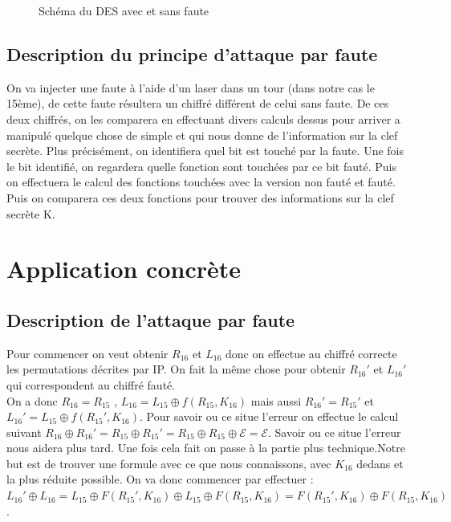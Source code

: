 \documentclass[a4paper]{report}
\begin{document}
\begin{figure}[h]
			
			\caption{Schéma du DES avec et sans faute}
			\end{figure}
		
			\section{Description du principe d'attaque par faute}
			
   On va injecter une faute à l'aide d'un laser dans un tour (dans notre cas le 15ème), de cette faute résultera un chiffré différent de celui sans faute.
De ces deux chiffrés, on les comparera en effectuant divers calculs dessus pour arriver a manipulé quelque chose de simple et qui nous donne de l'information sur la clef secrète.
Plus précisément, on identifiera quel bit est touché par la faute. Une fois le bit identifié, on regardera quelle fonction sont touchées par ce bit fauté.
Puis on effectuera le calcul des fonctions touchées avec la version non fauté et fauté. Puis on comparera ces deux fonctions pour trouver des informations sur la clef secrète K.
		\chapter{Application concrète}
			\section{Description de l'attaque par faute}
			Pour commencer on veut obtenir $R_{16}$ et $L_{16}$ donc on effectue au chiffré correcte les permutations décrites par IP. On fait la même chose pour obtenir $R_{16}'$ et $L_{16}'$ qui correspondent au chiffré fauté.\\
			On a donc $R_{16} = R_{15}$ , $L_{16} = L_{15}\oplus f(R_{15},K_{16})$ mais aussi $R_{16}'=R_{15}'$ et $L_{16}'=L_{15}\oplus f(R_{15}',K_{16})$.
			Pour savoir ou ce situe l'erreur on effectue le calcul suivant $R_{16}\oplus R_{16}' = R_{15}\oplus R_{15}' = R_{15}\oplus R_{15}\oplus \mathcal{E} = \mathcal{E}$. Savoir ou ce situe l'erreur nous aidera plus tard.
			\newline Une fois cela fait on passe à la partie plus technique.Notre but est de trouver une formule avec ce que nous connaissons, avec $K_{16}$ dedans et la plus réduite possible.
			On va donc commencer par effectuer :\\
			$L_{16}'\oplus L_{16} = L_{15}\oplus F(R_{15}',K_{16}) \oplus L_{15}\oplus F(R_{15},K_{16}) =F(R_{15}',K_{16})\oplus F(R_{15},K_{16})$.\\
			
\end{document}

